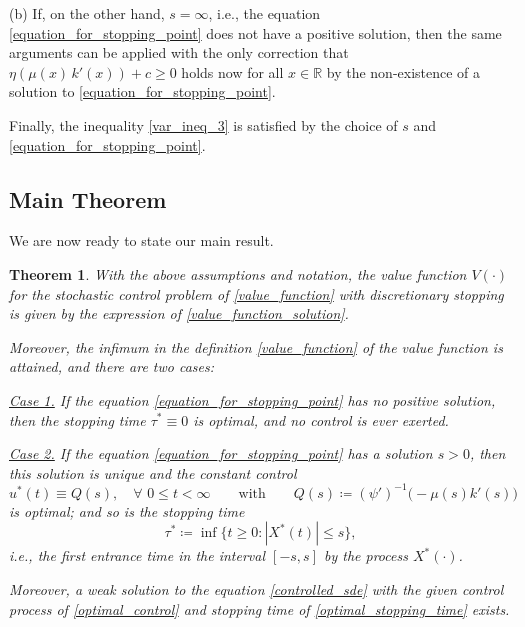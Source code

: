 \documentclass[11pt,tbtags,reqno]{article}
\newtheorem{Th}{Theorem}[section]
\theoremstyle{definition}
\numberwithin{equation}{section}
\theoremstyle{definition}
\begin{document}
(b) If, on the other hand, $s = \infty$, i.e., the equation \eqref{equation_for_stopping_point} does not have a positive solution, then the same arguments can be applied with the only correction that $\eta(\mu(x) \, k'(x)) + c \ge 0$ holds now for all $x \in \mathbb{R}$ by the non-existence of a solution to \eqref{equation_for_stopping_point}. 

Finally, the inequality \ref{var_ineq_3} is satisfied by the choice of $s$ and \eqref{equation_for_stopping_point}. 

\subsection{Main Theorem}

We are now ready to state our main result. 

\begin{Th}\label{main_result}
    With the above assumptions and notation, the value function $V(\cdot)$ for the stochastic control problem of \eqref{value_function} with discretionary stopping is given by the expression of \eqref{value_function_solution}. 
    
    Moreover, the infimum in the definition \eqref{value_function} of the value function is attained, and there are two cases:
    
    \underline{Case 1.} If the equation \eqref{equation_for_stopping_point} has no positive solution, then the stopping time $\tau^* \equiv 0$ is optimal, and no control is ever exerted. 

    \underline{Case 2.} If the equation \eqref{equation_for_stopping_point} has a solution $s > 0$, then this solution is unique and the constant control
    \begin{equation}\label{optimal_control}
        u^*(t) \equiv Q(s), \quad \forall \,\, 0 \le t < \infty \quad \quad \text{with} \quad \quad 
        Q(s) \coloneqq \left(\psi'\right)^{-1}\big(-\mu(s) k'(s)\big)
    \end{equation}
    is optimal; and so is the stopping time
    \begin{equation}\label{optimal_stopping_time}
        \tau^* \coloneqq \inf \{t \geq 0: |X^*(t)| \leq s\},
    \end{equation}
    i.e., the first entrance time in the interval $[-s, s]$ by the process $X^*(\cdot)$.
    
    Moreover, a weak solution to the equation \eqref{controlled_sde} with the given control process of \eqref{optimal_control} and stopping time of \eqref{optimal_stopping_time} exists.
\end{Th}
\end{document}
